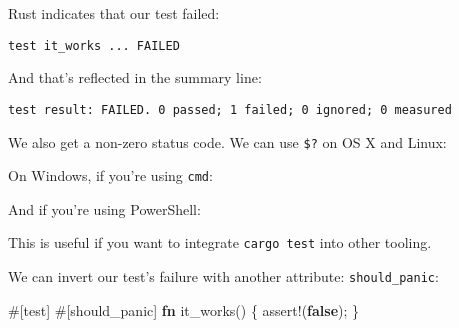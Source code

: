 \documentclass[a4paper,]{book}
\newenvironment{Shaded}{\begin{snugshade}}{\end{snugshade}}
\newcommand{\KeywordTok}[1]{\textcolor[rgb]{0.13,0.29,0.53}{\textbf{{#1}}}}
\newcommand{\CommentTok}[1]{\textcolor[rgb]{0.56,0.35,0.01}{\textit{{#1}}}}
\newcommand{\OtherTok}[1]{\textcolor[rgb]{0.56,0.35,0.01}{{#1}}}
\newcommand{\NormalTok}[1]{{#1}}
\begin{document}
Rust indicates that our test failed:

\begin{verbatim}
test it_works ... FAILED
\end{verbatim}

And that's reflected in the summary line:

\begin{verbatim}
test result: FAILED. 0 passed; 1 failed; 0 ignored; 0 measured
\end{verbatim}

We also get a non-zero status code. We can use \texttt{\$?} on OS X and
Linux:

\begin{Shaded}
\end{Shaded}

On Windows, if you're using \texttt{cmd}:

\begin{Shaded}
\end{Shaded}

And if you're using PowerShell:

\begin{Shaded}
\end{Shaded}

This is useful if you want to integrate \texttt{cargo\ test} into other
tooling.

We can invert our test's failure with another attribute:
\texttt{should\_panic}:

\begin{Shaded}
\begin{Highlighting}[]
\OtherTok{#[}\NormalTok{test}\OtherTok{]}
\OtherTok{#[}\NormalTok{should_panic}\OtherTok{]}
\KeywordTok{fn} \NormalTok{it_works() \{}
    \OtherTok{assert!}\NormalTok{(}\KeywordTok{false}\NormalTok{);}
\NormalTok{\}}
\end{Highlighting}
\end{Shaded}
\end{document}

